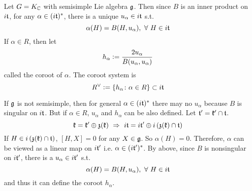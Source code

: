 \documentclass[a4paper,12pt]{article}
\begin{document}
	\begin{defn}
		Let $G=K_{\mathbb{C}}$ with semisimple Lie algebra $\mathfrak{g}$. Then since $B$ is an inner product on $i\mathfrak{t}$, for any $\alpha \in (i\mathfrak{t})^{*}$, there is a unique $u_{\alpha} \in i\mathfrak{t}$ s.t.
		\begin{equation*}
			\alpha(H) = B(H,u_{\alpha}),~\forall~H \in i\mathfrak{t}
		\end{equation*}
		If $\alpha \in R$, then let
		\begin{equation*}
			h_{\alpha} \vcentcolon= \frac{2u_{\alpha}}{B(u_{\alpha},u_{\alpha})}
		\end{equation*}
		called the coroot of $\alpha$. The coroot system is
		\begin{equation*}
			R^{\vee} \vcentcolon= \left\{h_{\alpha} \colon \alpha \in R\right\} \subset i\mathfrak{t}
		\end{equation*}
	\end{defn}
	\begin{rem}
		If $\mathfrak{g}$ is not semisimple, then for general $\alpha \in (i\mathfrak{t})^*$ there may no $u_{\alpha}$ because $B$ is singular on $i\mathfrak{t}$. But if $\alpha \in R$, $u_{\alpha}$ and $h_{\alpha}$ can be also defined. Let $\mathfrak{t}^{\prime} = \mathfrak{k}^{\prime} \cap \mathfrak{t}$.
		\begin{equation*}
			\mathfrak{k} = \mathfrak{k}^{\prime} \oplus \mathfrak{z(k)} ~\Rightarrow~ i\mathfrak{t} = i\mathfrak{t}^{\prime} \oplus i\left(\mathfrak{z(k)} \cap \mathfrak{t}\right)
		\end{equation*}
		If $H \in i\left(\mathfrak{z(k)} \cap \mathfrak{t}\right)$, $[H,X] = 0$ for any $X \in \mathfrak{g}$. So $\alpha(H) = 0$. Therefore, $\alpha$ can be viewed as a linear map on $i\mathfrak{t}^{\prime}$ i.e. $\alpha \in (i\mathfrak{t}^{\prime})^{*}$.  By above, since $B$ is nonsingular on $i\mathfrak{t}^{\prime}$, there is a $u_{\alpha} \in i\mathfrak{t}^{\prime}$ s.t.
		\begin{equation*}
			\alpha(H) = B(H,u_{\alpha}),~\forall~H \in i\mathfrak{t}
		\end{equation*}
		and thus it can define the coroot $h_{\alpha}$.
	\end{rem}
\end{document}
